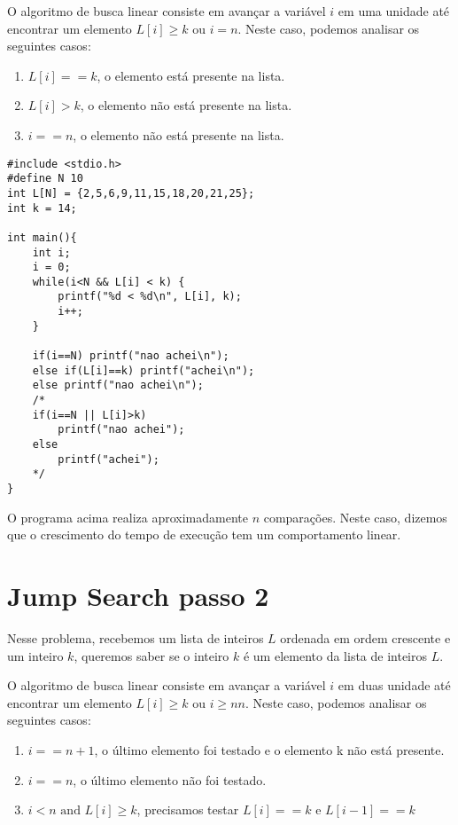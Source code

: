 \documentclass[a4paper,11pt]{article}
\begin{document}
O algoritmo de busca linear consiste em avançar a variável $i$ em uma unidade até encontrar um elemento $L[i] \geq k$ ou $i = n$. Neste caso, podemos analisar os seguintes casos:

\begin{enumerate}
    \item $L[i] == k$, o elemento está presente na lista.
    \item $L[i] > k$, o elemento não está presente na lista.
    \item $i == n$, o elemento não está presente na lista.
\end{enumerate}

\begin{verbatim}
#include <stdio.h>
#define N 10
int L[N] = {2,5,6,9,11,15,18,20,21,25};
int k = 14;

int main(){
	int i;
	i = 0;
	while(i<N && L[i] < k) { 
		printf("%d < %d\n", L[i], k);
		i++;
	}
	
	if(i==N) printf("nao achei\n");
	else if(L[i]==k) printf("achei\n");
	else printf("nao achei\n");
	/*
	if(i==N || L[i]>k)
		printf("nao achei");
	else
		printf("achei");
	*/
}
\end{verbatim}

O programa acima realiza aproximadamente $n$ comparações. Neste caso, dizemos que o crescimento do tempo de execução tem um comportamento linear.


\newpage 


\section*{Jump Search passo 2}

Nesse problema, recebemos um lista de inteiros $L$ ordenada em ordem crescente e um inteiro $k$, queremos saber se o inteiro $k$ é um elemento da lista de inteiros $L$.

O algoritmo de busca linear consiste em avançar a variável $i$ em duas unidade até encontrar um elemento $L[i] \geq k$ ou $i \geq n n$. Neste caso, podemos analisar os seguintes casos:


\begin{enumerate}
    \item $i == n+1$, o último elemento foi testado e o elemento k não está presente.
    \item $i == n$, o último elemento não foi testado.
    \item $i < n \mbox{ and } L[i] \geq k$, precisamos testar $L[i]==k$ e $L[i-1]==k$   
\end{enumerate}
\end{document}
